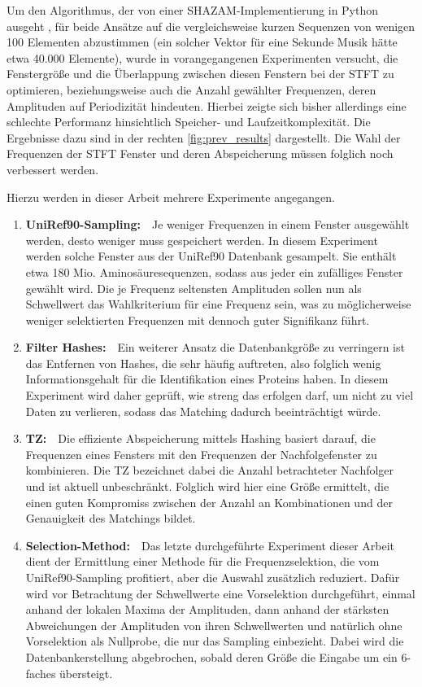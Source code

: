     Um den Algorithmus, der von einer SHAZAM-Implementierung in Python ausgeht \autocite{blog}, für beide Ansätze auf die vergleichsweise kurzen Sequenzen von wenigen 100 Elementen abzustimmen (ein solcher Vektor für eine Sekunde Musik hätte etwa 40.000 Elemente), wurde in vorangegangenen Experimenten versucht, die Fenstergröße und die Überlappung zwischen diesen Fenstern bei der \ac{STFT} zu optimieren, beziehungsweise auch die Anzahl gewählter Frequenzen, deren Amplituden auf Periodizität hindeuten. Hierbei zeigte sich bisher allerdings eine schlechte Performanz hinsichtlich Speicher- und Laufzeitkomplexität. Die Ergebnisse dazu sind in der rechten \autoref{fig:prev_results} dargestellt. Die Wahl der Frequenzen der \ac{STFT} Fenster und deren Abspeicherung müssen folglich noch verbessert werden.

    Hierzu werden in dieser Arbeit mehrere Experimente angegangen.
    \begin{enumerate}
        \item \textbf{UniRef90-Sampling:}\ \ Je weniger Frequenzen in einem Fenster ausgewählt werden, desto weniger muss gespeichert werden. In diesem Experiment werden solche Fenster aus der UniRef90 Datenbank gesampelt. Sie enthält etwa 180 Mio. Aminosäuresequenzen, sodass aus jeder ein zufälliges Fenster gewählt wird. Die je Frequenz seltensten Amplituden sollen nun als Schwellwert das Wahlkriterium für eine Frequenz sein, was zu möglicherweise weniger selektierten Frequenzen mit dennoch guter Signifikanz führt.
        \item \textbf{Filter Hashes:}\ \ Ein weiterer Ansatz die Datenbankgröße zu verringern ist das Entfernen von Hashes, die sehr häufig auftreten, also folglich wenig Informationsgehalt für die Identifikation eines Proteins haben. In diesem Experiment wird daher geprüft, wie streng das erfolgen darf, um nicht zu viel Daten zu verlieren, sodass das Matching dadurch beeinträchtigt würde. 
        \item \textbf{\acl{TZ}:}\ \ Die effiziente Abspeicherung mittels Hashing basiert darauf, die Frequenzen eines Fensters mit den Frequenzen der Nachfolgefenster zu kombinieren. Die \acl{TZ} bezeichnet dabei die Anzahl betrachteter Nachfolger und ist aktuell unbeschränkt. Folglich wird hier eine Größe ermittelt, die einen guten Kompromiss zwischen der Anzahl an Kombinationen und der Genauigkeit des Matchings bildet.
        \item \textbf{Selection-Method:}\ \ Das letzte durchgeführte Experiment dieser Arbeit dient der Ermittlung einer Methode für die Frequenzselektion, die vom UniRef90-Sampling profitiert, aber die Auswahl zusätzlich reduziert. Dafür wird vor Betrachtung der Schwellwerte eine Vorselektion durchgeführt, einmal anhand der lokalen Maxima der Amplituden, dann anhand der stärksten Abweichungen der Amplituden von ihren Schwellwerten und natürlich ohne Vorselektion als Nullprobe, die nur das Sampling einbezieht. Dabei wird die Datenbankerstellung abgebrochen, sobald deren Größe die Eingabe um ein 6-faches übersteigt.
    \end{enumerate}
